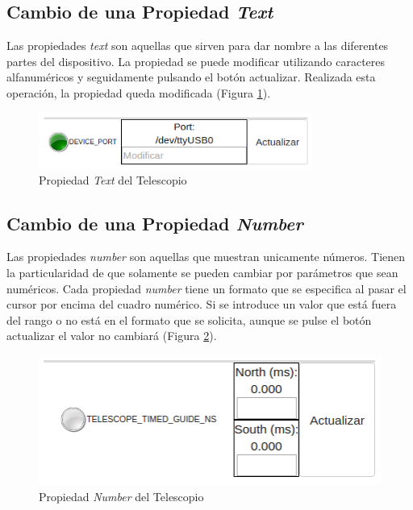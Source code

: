 \subsection{Cambio de una Propiedad \textit{Text}}
Las propiedades \textit{text} son aquellas que sirven para dar nombre a las diferentes partes del dispositivo.
La propiedad se puede modificar utilizando caracteres alfanuméricos y seguidamente pulsando el botón actualizar. Realizada esta operación, la propiedad queda modificada (Figura \ref{fig:propiedadText}).
\begin{figure}[htb]
\centering
\includegraphics[width=0.8\textwidth]{./imagenes/capturaText}
\caption{Propiedad \textit{Text} del Telescopio} \label{fig:propiedadText}
\end{figure}

\subsection{Cambio de una Propiedad \textit{Number}}
Las propiedades \textit{number} son aquellas que muestran unicamente números. Tienen la particularidad de que solamente se pueden cambiar por parámetros que sean numéricos. Cada propiedad \textit{number} tiene un formato que se especifica al pasar el cursor por encima del cuadro numérico. Si se introduce un valor que está fuera del rango o no está en el formato que se solicita, aunque se pulse el botón actualizar el valor no cambiará (Figura \ref{fig:propiedadNumber}).
\begin{figure}[htb]
\centering
\includegraphics[width=1\textwidth]{./imagenes/capturaNumber}
\caption{Propiedad \textit{Number} del Telescopio} \label{fig:propiedadNumber}
\end{figure}

